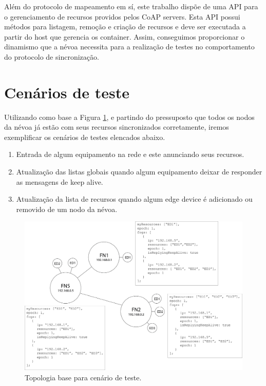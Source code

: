 Além do protocolo de mapeamento em sí, este trabalho dispõe de uma API para o gerenciamento de recursos providos pelos CoAP servers.
Esta API possui métodos para listagem, remoção e criação de recursos e deve ser executada a partir do host que gerencia os container.
Assim, conseguimos proporcionar o dinamismo que a névoa necessita para a realização de testes no comportamento do protocolo de sincronização.



\section{Cenários de teste}



Utilizando como base a Figura \ref{fig:fig7}, e partindo do pressuposto que todos os nodos da névoa já estão com seus recursos sincronizados corretamente,
iremos exemplificar os cenários de testes elencados abaixo.

\begin{enumerate}
    \item Entrada de algum equipamento na rede e este anunciando seus recursos. 
    \item Atualização das listas globais quando algum equipamento deixar de responder as mensagens de keep alive.
    \item Atualização da lista de recursos quando algum edge device é adicionado ou removido de um nodo da névoa.
\end{enumerate}

\begin{figure}[H]
    \centering\includegraphics[width=.8\textwidth]{fig7.png}
    \caption%
    {\label{fig:fig7} Topologia base para cenário de teste.}
\end{figure}

